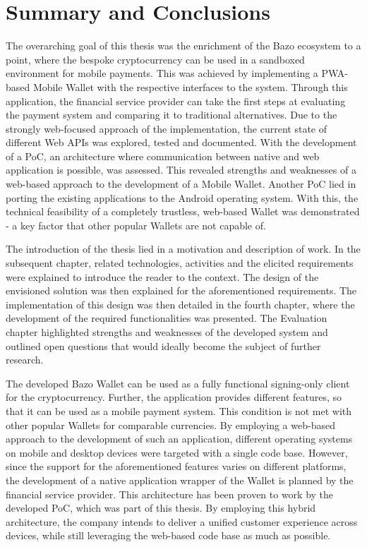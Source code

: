 \chapter{Summary and Conclusions}

The overarching goal of this thesis was the enrichment of the Bazo ecosystem to a point, where the bespoke cryptocurrency can be used in a sandboxed environment for mobile payments. This was achieved by implementing a PWA-based Mobile Wallet with the respective interfaces to the system. Through this application, the financial service provider can take the first steps at evaluating the payment system and comparing it to traditional alternatives. Due to the strongly web-focused approach of the implementation, the current state of different Web APIs was explored, tested and documented. With the development of a PoC, an architecture where communication between native and web application is possible, was assessed. This revealed strengths and weaknesses of a web-based approach to the development of a Mobile Wallet. Another PoC lied in porting the existing applications to the Android operating system. With this, the technical feasibility of a completely trustless, web-based Wallet was demonstrated - a key factor that other popular Wallets are not capable of.

The introduction of the thesis lied in a motivation and description of work. In the subsequent chapter, related technologies, activities and the elicited requirements were explained to introduce the reader to the context. The design of the envisioned solution was then explained for the aforementioned requirements. The implementation of this design was then detailed in the fourth chapter, where the development of the required functionalities was presented. The Evaluation chapter highlighted strengths and weaknesses of the developed system and outlined open questions that would ideally become the subject of further research.

The developed Bazo Wallet can be used as a fully functional signing-only client for the cryptocurrency. Further, the application provides different features, so that it can be used as a mobile payment system. This condition is not met with other popular Wallets for comparable currencies. By employing a web-based approach to the development of such an application, different operating systems on mobile and desktop devices were targeted with a single code base. However, since the support for the aforementioned features varies on different platforms, the development of a native application wrapper of the Wallet is planned by the financial service provider. This architecture has been proven to work by the developed PoC, which was part of this thesis. By employing this hybrid architecture, the company intends to deliver a unified customer experience across devices, while still leveraging the web-based code base as much as possible.